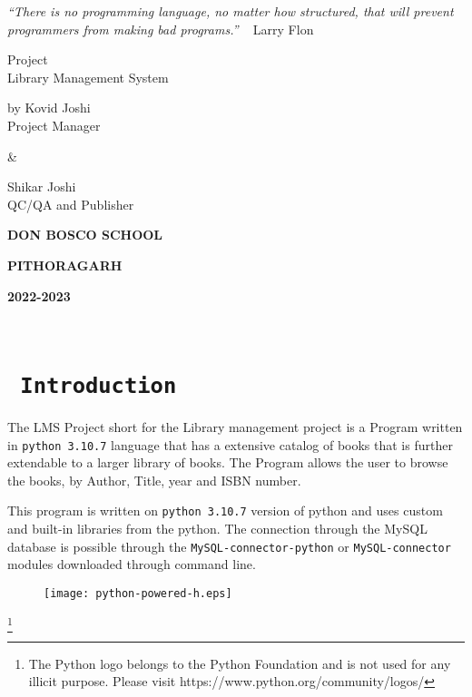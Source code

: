 \documentclass[12pt, a4paper, titlepage, openany]{report}
\begin{document}
\begin{titlepage}
\centering
{\emph{``There is no programming language, no matter how structured, that will prevent programmers from making bad programs.''} ~ Larry Flon}\par
\vfill

{\huge  Project \\Library Management System}\par

\vspace{5cm}
{\LARGE by Kovid Joshi \\Project Manager}\par
\vspace{10mm}
{\&}\par
\vspace{10mm}
{\LARGE Shikar Joshi \\QC/QA and Publisher}\par
\vspace{20mm}
{\huge \bf \rmfamily DON BOSCO SCHOOL}\par
\vspace{7mm}
{\huge \bf \rmfamily PITHORAGARH}\par
\vfill
{\bf \LARGE 2022-2023}
\vspace{3cm}

\end{titlepage}
\newpage
\
\newpage

\section*{\centering \texttt{ Introduction}}
\begin{sloppypar}
	The LMS Project short for the Library management project is a Program written in \verb+python 3.10.7+ language that has a extensive catalog of books that is further extendable to a larger library of books. The Program allows the user to browse the books, by Author, Title, year and ISBN number.

This program is written on \verb+python 3.10.7+ version of python and uses custom and built-in libraries from the python. The connection through the MySQL database is possible through the \verb+MySQL-connector-python+ or \verb+MySQL-connector+ modules downloaded through command line.

\begin{figure}
\centering
\texttt{[image: python-powered-h.eps]}
\end{figure}
\footnote{The Python logo belongs to the Python Foundation and is not used for any illicit purpose. Please visit https://www.python.org/community/logos/}
\end{sloppypar}
\end{document}
